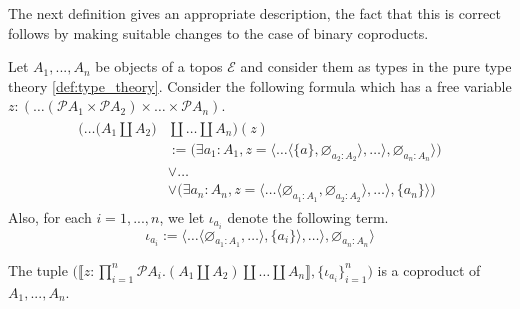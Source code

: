 \documentclass{tac}
\newcommand{\call}[1]{\mathcal{#1}}
\begin{document}
The next definition gives an appropriate description, the fact that this is correct follows by making suitable changes to the case of binary coproducts.
	\begin{definition}
		Let $A_1,...,A_n$ be objects of a topos $\call{E}$ and consider them as types in the pure type theory \eqref{def:type_theory}. Consider the following formula which has a free variable $z: (\hdots (\call{P} A_1 \times \call{P} A_2) \times \hdots \times \call{P}A_n)$.
		\begin{align}
			\begin{split}
				\big( \hdots \big(A_1 \coprod A_2\big) &\coprod \hdots  \coprod A_n \big)(z) \\
			&:= \big( \exists a_1: A_1, z = \langle \hdots \langle \lbrace a \rbrace, \varnothing_{a_2: A_2}\rangle, \hdots \rangle , \varnothing_{a_n: A_n}\rangle\big)\\
			&\vee \hdots\\
			&\vee \big(\exists a_n: A_n, z = \langle \hdots \langle \varnothing_{a_1: A_1}, \varnothing_{a_2: A_2}\rangle, \hdots \rangle, \lbrace a_n\rbrace\rangle\big)
			\end{split}
			\end{align}
		Also, for each $i = 1,..., n$, we let $\iota_{a_i}$ denote the following term.
		\begin{equation}
			\iota_{a_i} := \langle \hdots \langle \varnothing_{a_1:A_1}, \hdots \rangle,  \lbrace a_i\rbrace \rangle, \hdots \rangle, \varnothing_{a_n: A_n}\rangle
			\end{equation}
	\end{definition}
\begin{proposition}
	The tuple $\big(\llbracket z: \prod_{i = 1}^n \call{P} A_i. (A_1 \coprod A_2) \coprod \hdots \coprod A_n \rrbracket, \lbrace \iota_{a_i}\rbrace_{i = 1}^n \big)$ is a coproduct of $A_1,...,A_n$.
	\end{proposition}
	
	
\end{document}
